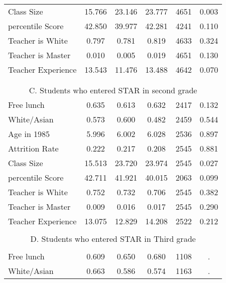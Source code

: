 \documentclass{article}
\begin{document}
\begin{table}[htbp]
\begin{tabular}{llcccrc}
    \multicolumn{2}{l}{Class Size} & 15.766  & 23.146  & 23.777  & 4651  & 0.003  \\
    \multicolumn{2}{l}{percentile Score} & 42.850  & 39.977  & 42.281  & 4241  & 0.110  \\
    \multicolumn{2}{l}{Teacher is White} & 0.797  & 0.781  & 0.819  & 4633  & 0.324  \\
    \multicolumn{2}{l}{Teacher is Master} & 0.010  & 0.005  & 0.019  & 4651  & 0.130  \\
    \multicolumn{2}{l}{Teacher Experience} & 13.543  & 11.476  & 13.488  & 4642  & 0.070  \\
          &       &       &       &       &       &  \\
          &       &       &       &       &       &  \\
    \multicolumn{7}{c}{C. Students who entered STAR in second grade} \\
    \multicolumn{2}{l}{Free lunch} & 0.635  & 0.613  & 0.632  & 2417  & 0.132  \\
    \multicolumn{2}{l}{White/Asian} & 0.573  & 0.600  & 0.482  & 2459  & 0.544  \\
    \multicolumn{2}{l}{Age in 1985} & 5.996  & 6.002  & 6.028  & 2536  & 0.897  \\
    \multicolumn{2}{l}{Attrition Rate} & 0.222  & 0.217  & 0.208  & 2545  & 0.881  \\
    \multicolumn{2}{l}{Class Size} & 15.513  & 23.720  & 23.974  & 2545  & 0.027  \\
    \multicolumn{2}{l}{percentile Score} & 42.711  & 41.921  & 40.015  & 2063  & 0.099  \\
    \multicolumn{2}{l}{Teacher is White} & 0.752  & 0.732  & 0.706  & 2545  & 0.382  \\
    \multicolumn{2}{l}{Teacher is Master} & 0.009  & 0.016  & 0.017  & 2545  & 0.290  \\
    \multicolumn{2}{l}{Teacher Experience} & 13.075  & 12.829  & 14.208  & 2522  & 0.212  \\
          &       &       &       &       &       &  \\
    \multicolumn{7}{c}{D. Students who entered STAR in Third grade} \\
          &       &       &       &       &       &  \\
    \multicolumn{2}{l}{Free lunch} & 0.609  & 0.650  & 0.680  & 1108  & . \\
    \multicolumn{2}{l}{White/Asian} & 0.663  & 0.586  & 0.574  & 1163  & . \\

\end{tabular}
\end{table}
\end{document}
